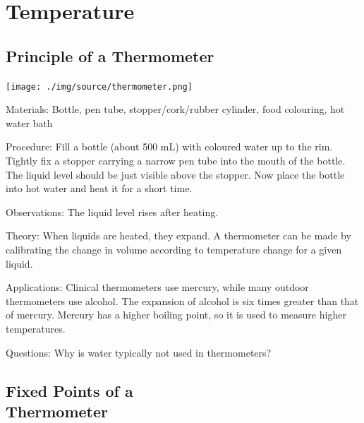 \section{Temperature}

\begin{multicols}{2}


\subsection{Principle of a Thermometer}

\begin{center}
\texttt{[image: ./img/source/thermometer.png]}
\end{center}

\begin{description*}
\item[Materials:]{Bottle, pen tube, stopper/cork/rubber cylinder, food colouring, hot water bath}
\item[Procedure:]{Fill a bottle (about 500 mL) with coloured water up to the rim. Tightly fix a stopper carrying a narrow pen tube into the mouth of the bottle. The liquid level should be just visible above the stopper. Now place the bottle into hot water and heat it for a short time.}
\item[Observations:]{The liquid level rises after heating.}
\item[Theory:]{When liquids are heated, they expand. A thermometer can be made by calibrating the change in volume according to temperature change for a given liquid.}
\item[Applications:]{Clinical thermometers use mercury, while many outdoor thermometers use alcohol. The expansion of alcohol is six times greater than that of mercury. Mercury has a higher boiling point, so it is used to measure higher temperatures.}
\item[Questions:]{Why is water typically not used in thermometers?}
\end{description*}

\vfill
\columnbreak

\subsection[Fixed Points of a Thermometer]{Fixed Points of a \hfill \\ Thermometer}


\end{multicols}
